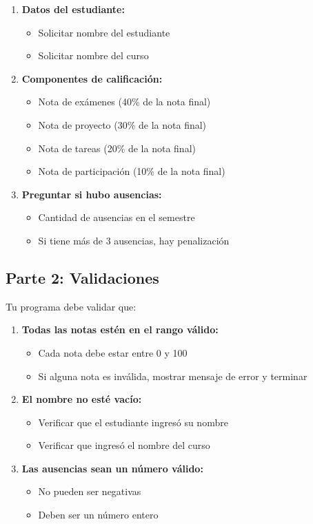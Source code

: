 \documentclass[12pt,a4paper]{article}
\begin{document}
\begin{enumerate}[leftmargin=*]
    \item \textbf{Datos del estudiante:}
    \begin{itemize}
        \item Solicitar nombre del estudiante
        \item Solicitar nombre del curso
    \end{itemize}
    
    \item \textbf{Componentes de calificación:}
    \begin{itemize}
        \item Nota de exámenes (40\% de la nota final)
        \item Nota de proyecto (30\% de la nota final)
        \item Nota de tareas (20\% de la nota final)
        \item Nota de participación (10\% de la nota final)
    \end{itemize}
    
    \item \textbf{Preguntar si hubo ausencias:}
    \begin{itemize}
        \item Cantidad de ausencias en el semestre
        \item Si tiene más de 3 ausencias, hay penalización
    \end{itemize}
\end{enumerate}

\subsection{Parte 2: Validaciones}

Tu programa debe validar que:

\begin{enumerate}[leftmargin=*]
    \item \textbf{Todas las notas estén en el rango válido:}
    \begin{itemize}
        \item Cada nota debe estar entre 0 y 100
        \item Si alguna nota es inválida, mostrar mensaje de error y terminar
    \end{itemize}
    
    \item \textbf{El nombre no esté vacío:}
    \begin{itemize}
        \item Verificar que el estudiante ingresó su nombre
        \item Verificar que ingresó el nombre del curso
    \end{itemize}
    
    \item \textbf{Las ausencias sean un número válido:}
    \begin{itemize}
        \item No pueden ser negativas
        \item Deben ser un número entero
    \end{itemize}
\end{enumerate}
\end{document}
